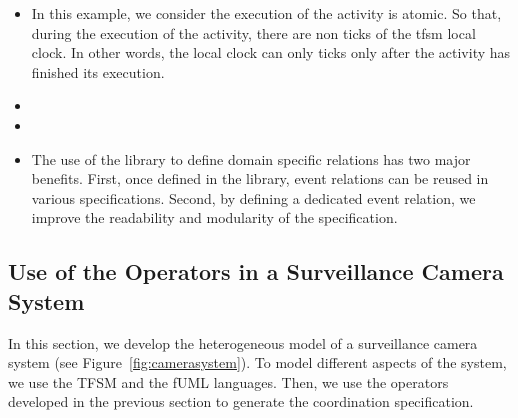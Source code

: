 \begin{itemize}
		\item In this example, we consider the execution of the activity is atomic. So that, during the execution of the activity, there are non ticks of the tfsm local clock. In other words, the local clock can only ticks only after the activity has finished its execution. 
		
		\item {}
		
		\item {}
	
		\item The use of the library to define domain specific relations has two major benefits. First, once defined in the library, event relations can be reused in various \bcool specifications. Second, by defining a dedicated event relation, we improve the readability and modularity of the \bcool specification.
	
	\end{itemize}

	\subsection{Use of the Operators in a Surveillance Camera System}
	In this section, we develop the heterogeneous model of a surveillance camera system (see Figure~\ref{fig:camerasystem}). To model different aspects of the system, we use the TFSM and the fUML languages. Then, we use the operators developed in the previous section to generate the coordination specification. 
	
